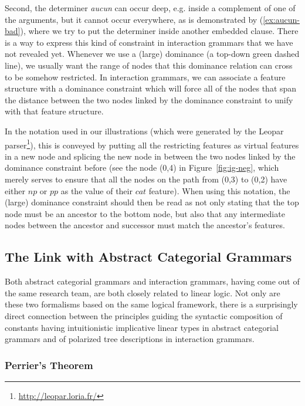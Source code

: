 Second, the determiner \emph{aucun} can occur deep, e.g. inside a complement
of one of the arguments, but it cannot occur everywhere, as is
demonstrated by (\ref{ex:aucun-bad}), where we try to put the determiner
inside another embedded clause. There is a way to express this kind of
constraint in interaction grammars that we have not revealed
yet. Whenever we use a (large) dominance (a top-down green dashed line),
we usually want the range of nodes that this dominance relation can
cross to be somehow restricted. In interaction grammars, we can
associate a feature structure with a dominance constraint which will
force all of the nodes that span the distance between the two nodes
linked by the dominance constraint to unify with that feature structure.

In the notation used in our illustrations (which were generated by the
Leopar parser\footnote{\url{http://leopar.loria.fr/}}), this is conveyed
by putting all the restricting features as virtual features in a new
node and splicing the new node in between the two nodes linked by the
dominance constraint before (see the node (0,4) in
Figure~\ref{fig:ig-neg}, which merely serves to ensure that all the
nodes on the path from (0,3) to (0,2) have either $np$ or $pp$ as the
value of their $cat$ feature). When using this notation, the (large)
dominance constraint should then be read as not only stating that the
top node must be an ancestor to the bottom node, but also that any
intermediate nodes between the ancestor and successor must match the
ancestor's features.

\subsection{The Link with Abstract Categorial Grammars}
\label{ssec:link-ig-acg}

Both abstract categorial grammars and interaction grammars, having come
out of the same research team, are both closely related to linear
logic. Not only are these two formalisms based on the same logical
framework, there is a surprisingly direct connection between the
principles guiding the syntactic composition of constants having
intuitionistic implicative linear types in abstract categorial grammars
and of polarized tree descriptions in interaction grammars.

\subsubsection{Perrier's Theorem}


